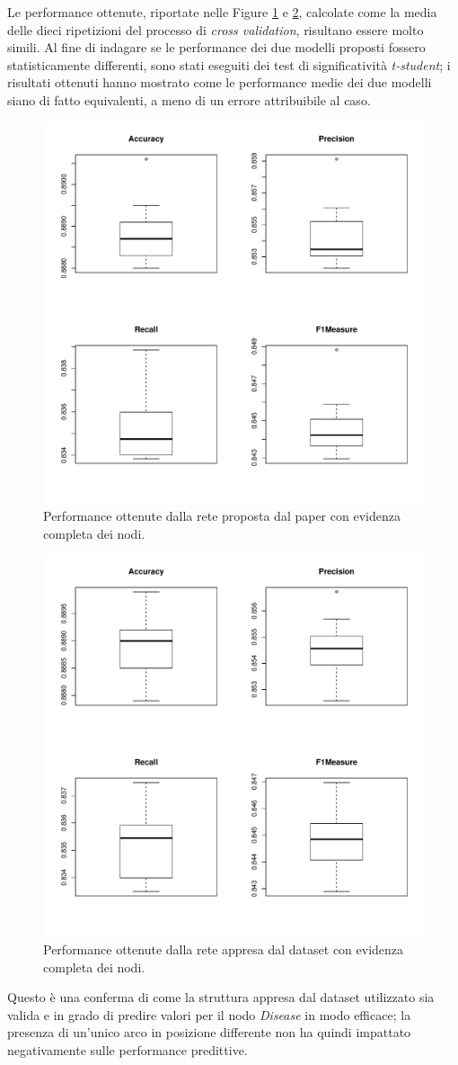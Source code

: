 Le performance ottenute, riportate nelle Figure \ref{fig:paperperformance} e \ref{fig:inducedperformance}, calcolate come la media delle dieci ripetizioni del processo di \textit{cross validation}, risultano essere molto simili. Al fine di indagare se le performance dei due modelli proposti fossero statisticamente differenti, sono stati eseguiti dei test di significatività \textit{t-student}; i risultati ottenuti hanno mostrato come le performance medie dei due modelli siano di fatto equivalenti, a meno di un errore attribuibile al caso.
\begin{figure}
	\centering
	\includegraphics[width=0.7\linewidth]{images/paper_performance}
	\caption{Performance ottenute dalla rete proposta dal paper con evidenza completa dei nodi.}
	\label{fig:paperperformance}
\end{figure}
\begin{figure}
	\centering
	\includegraphics[width=0.7\linewidth]{images/induced_performance}
	\caption{Performance ottenute dalla rete appresa dal dataset con evidenza completa dei nodi.}
	\label{fig:inducedperformance}
\end{figure}
Questo è una conferma di come la struttura appresa dal dataset utilizzato sia valida e in grado di predire valori per il nodo \textit{Disease} in modo efficace; la presenza di un'unico arco in posizione differente non ha quindi impattato negativamente sulle performance predittive.

